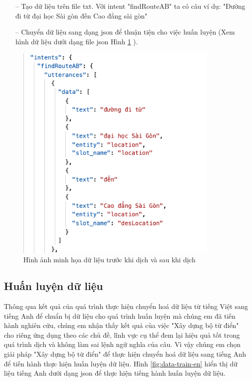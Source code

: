 \begin{itemize}
    \item[--] Tạo dữ liệu trên file txt. Với intent "findRouteAB" ta có câu ví dụ: "Đường đi từ đại học Sài gòn đến Cao đẳng sài gòn"
    \item[--] Chuyển dữ liệu sang dạng json để thuận tiện cho việc huấn luyện (Xem hình dữ liệu dưới dạng file json Hình \ref{fig:data-train-json} ).
\end{itemize}
\begin{figure}[H]
    \centering
    \includegraphics[width=10cm]{images/Data-train-json.png}
    \caption{Hình ảnh minh họa dữ liệu trước khi dịch và sau khi dịch}
    \label{fig:data-train-json}
\end{figure}

\subsection{Huấn luyện dữ liệu}

Thông qua kết quả của quá trình thực hiện chuyển hoá dữ liệu từ tiếng Việt sang tiếng Anh để chuẩn bị dữ liệu cho quá trình huấn luyện mà chúng em đã tiến hành nghiên cứu, chúng em nhận thấy kết quả của việc "Xây dựng bộ từ điển" cho riêng ứng dụng theo các chủ đề, lĩnh vực cụ thể đem lại hiệu quả tốt trong quá trình dịch và không làm sai lệnh ngữ nghĩa của câu. Vì vậy chúng em chọn giải pháp "Xây dựng bộ từ điển" để thực hiện chuyển hoá dữ liệu sang tiếng Anh để tiến hành thực hiện huấn luyện dữ liệu. Hình \ref{fig:data-train-en} hiển thị dữ liệu tiếng Anh dưới dạng json để thực hiện tiếng hành huấn luyện dữ liệu.

